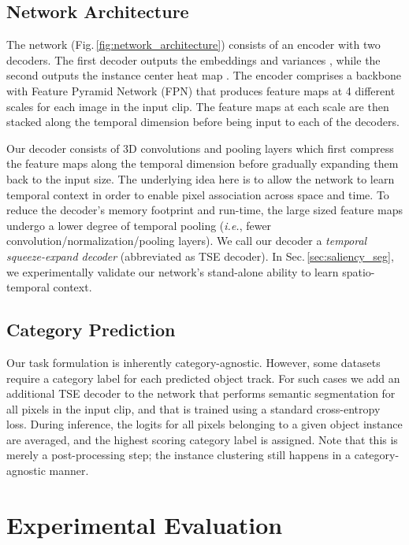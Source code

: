 \documentclass[runningheads]{llncs}
\makeatletter
\newcommand*{\ie}{\emph{i.e.}\@\xspace}
\newcommand{\refsec}[1]{Sec.\,\ref{sec:#1}}
\newcommand{\reffig}[1]{Fig.\,\ref{fig:#1}}
\makeatother
\begin{document}
\subsection{Network Architecture}
\label{sec:network_architecture}

The network (\reffig{network_architecture}) consists of an encoder with two decoders. The first decoder outputs the embeddings  and variances , while the second outputs the instance center heat map . The encoder comprises a backbone with Feature Pyramid Network (FPN) that produces feature maps at 4 different scales for each image in the input clip. The feature maps at each scale are then stacked along the temporal dimension before being input to each of the decoders. 

Our decoder consists of 3D convolutions and pooling layers which first compress the feature maps along the temporal dimension before gradually expanding them back to the input size. The underlying idea here is to allow the network to learn temporal context in order to enable pixel association across space and time. To reduce the decoder's memory footprint and run-time, the large sized feature maps undergo a lower degree of temporal pooling (\ie, fewer convolution/normalization/pooling layers). We call our decoder a \textit{temporal squeeze-expand decoder} (abbreviated as TSE decoder). In \refsec{saliency_seg}, we experimentally validate our network's stand-alone ability to learn spatio-temporal context.

\subsection{Category Prediction}
\label{sec:category_classification}

Our task formulation is inherently category-agnostic. However, some datasets~\cite{Voigtlaender19CVPR,Yang19ICCV} require a category label for each predicted object track. For such cases we add an additional TSE decoder to the network that performs semantic segmentation for all pixels in the input clip, and that is trained using a standard cross-entropy loss. During inference, the logits for all pixels belonging to a given object instance are averaged, and the highest scoring category label is assigned. Note that this is merely a post-processing step; the instance clustering still happens in a category-agnostic manner. 
 
\section{Experimental Evaluation}
\end{document}
